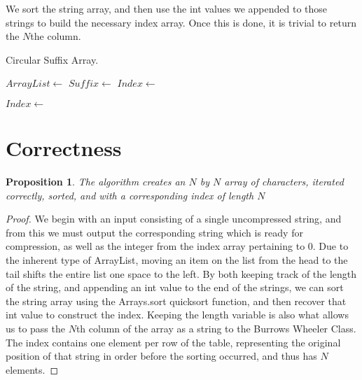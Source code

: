 \documentclass[12pt]{article}
\newtheorem{proposition}[theorem]{Proposition}
\begin{document}
We sort the string array, and then use the int values we appended to
those strings to build the necessary index array. Once this is
done, it is trivial to return the $N$the column.


\begin{algorithm}[H]
\caption{Circular Suffix Array.}
\begin{algorithmic}
        \State $ArrayList \gets$ 
        \State $Suffix \gets$ 
        		\State {}
            \State {}
        \EndFor
        \State $Index \gets$ 
        
            \State $Index \gets$ 
        \EndFor
    \EndProcedure
\end{algorithmic}
\end{algorithm}


\section{Correctness}

\begin{proposition}
The algorithm creates an $N$ by $N$ array of characters, iterated correctly, sorted, and with a corresponding index of length $N$
\end{proposition}

\begin{proof}
We begin with an input consisting of a single uncompressed string, and from this we must output the corresponding string which is ready for compression, as well as the integer from the index array pertaining to 0.
Due to the inherent type of ArrayList, moving an item on the list from the head to the tail shifts the entire list one space to the left. By both keeping track of the length of the string, and appending an int value to the end of the strings, we can sort the string array using the Arrays.sort quicksort function, and then recover that int value to construct the index. Keeping the length variable is also what allows us to pass the $N$th column of the array as a string to the Burrows Wheeler Class. The index contains one element per row of the table, representing the original position of that string in order before the sorting occurred, and thus has $N$ elements.
\end{proof}
\end{document}
